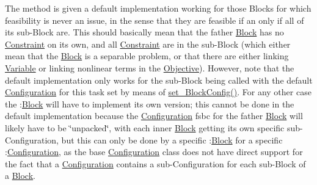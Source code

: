 The method is given a default implementation working for those Blocks for which feasibility is never an issue, in the sense that they are feasible if an only if all of its sub-\/\+Block are. This should basically mean that the father \mbox{\hyperlink{class_s_m_spp__di__unipi__it_1_1_block}{Block}} has no \mbox{\hyperlink{class_s_m_spp__di__unipi__it_1_1_constraint}{Constraint}} on its own, and all \mbox{\hyperlink{class_s_m_spp__di__unipi__it_1_1_constraint}{Constraint}} are in the sub-\/\+Block (which either mean that the \mbox{\hyperlink{class_s_m_spp__di__unipi__it_1_1_block}{Block}} is a separable problem, or that there are either linking \mbox{\hyperlink{class_s_m_spp__di__unipi__it_1_1_variable}{Variable}} or linking nonlinear terms in the \mbox{\hyperlink{class_s_m_spp__di__unipi__it_1_1_objective}{Objective}}). However, note that the default implementation only works for the sub-\/\+Block being called with the default \mbox{\hyperlink{class_s_m_spp__di__unipi__it_1_1_configuration}{Configuration}} for this task set by means of \mbox{\hyperlink{class_s_m_spp__di__unipi__it_1_1_block_a18d411b740a47db00d15083c5c7ef2ba}{set\+\_\+\+Block\+Config()}}. For any other case the \+:\mbox{\hyperlink{class_s_m_spp__di__unipi__it_1_1_block}{Block}} will have to implement its own version; this cannot be done in the default implementation because the \mbox{\hyperlink{class_s_m_spp__di__unipi__it_1_1_configuration}{Configuration}} fsbc for the father \mbox{\hyperlink{class_s_m_spp__di__unipi__it_1_1_block}{Block}} will likely have to be \char`\"{}unpacked\char`\"{}, with each inner \mbox{\hyperlink{class_s_m_spp__di__unipi__it_1_1_block}{Block}} getting its own specific sub-\/\+Configuration, but this can only be done by a specific \+:\mbox{\hyperlink{class_s_m_spp__di__unipi__it_1_1_block}{Block}} for a specific \+:\mbox{\hyperlink{class_s_m_spp__di__unipi__it_1_1_configuration}{Configuration}}, as the base \mbox{\hyperlink{class_s_m_spp__di__unipi__it_1_1_configuration}{Configuration}} class does not have direct support for the fact that a \mbox{\hyperlink{class_s_m_spp__di__unipi__it_1_1_configuration}{Configuration}} contains a sub-\/\+Configuration for each sub-\/\+Block of a \mbox{\hyperlink{class_s_m_spp__di__unipi__it_1_1_block}{Block}}. \mbox{\label{class_s_m_spp__di__unipi__it_1_1_block_a44ef42401ecae613574f3df619480de1}} 
